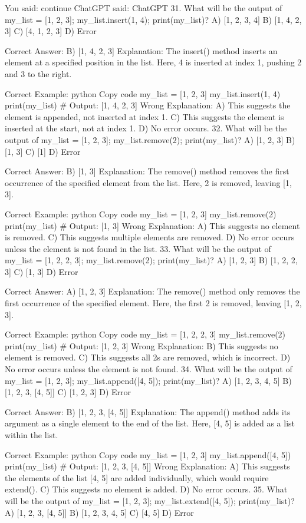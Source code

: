 You said:
continue
ChatGPT said:
ChatGPT
31. What will be the output of my_list = [1, 2, 3]; my_list.insert(1, 4); print(my_list)?
A) [1, 2, 3, 4]
B) [1, 4, 2, 3]
C) [4, 1, 2, 3]
D) Error

Correct Answer: B) [1, 4, 2, 3]
Explanation: The insert() method inserts an element at a specified position in the list. Here, 4 is inserted at index 1, pushing 2 and 3 to the right.

Correct Example:
python
Copy code
my_list = [1, 2, 3]
my_list.insert(1, 4)
print(my_list)  # Output: [1, 4, 2, 3]
Wrong Explanation:
A) This suggests the element is appended, not inserted at index 1.
C) This suggests the element is inserted at the start, not at index 1.
D) No error occurs.
32. What will be the output of my_list = [1, 2, 3]; my_list.remove(2); print(my_list)?
A) [1, 2, 3]
B) [1, 3]
C) [1]
D) Error

Correct Answer: B) [1, 3]
Explanation: The remove() method removes the first occurrence of the specified element from the list. Here, 2 is removed, leaving [1, 3].

Correct Example:
python
Copy code
my_list = [1, 2, 3]
my_list.remove(2)
print(my_list)  # Output: [1, 3]
Wrong Explanation:
A) This suggests no element is removed.
C) This suggests multiple elements are removed.
D) No error occurs unless the element is not found in the list.
33. What will be the output of my_list = [1, 2, 2, 3]; my_list.remove(2); print(my_list)?
A) [1, 2, 3]
B) [1, 2, 2, 3]
C) [1, 3]
D) Error

Correct Answer: A) [1, 2, 3]
Explanation: The remove() method only removes the first occurrence of the specified element. Here, the first 2 is removed, leaving [1, 2, 3].

Correct Example:
python
Copy code
my_list = [1, 2, 2, 3]
my_list.remove(2)
print(my_list)  # Output: [1, 2, 3]
Wrong Explanation:
B) This suggests no element is removed.
C) This suggests all 2s are removed, which is incorrect.
D) No error occurs unless the element is not found.
34. What will be the output of my_list = [1, 2, 3]; my_list.append([4, 5]); print(my_list)?
A) [1, 2, 3, 4, 5]
B) [1, 2, 3, [4, 5]]
C) [1, 2, 3]
D) Error

Correct Answer: B) [1, 2, 3, [4, 5]]
Explanation: The append() method adds its argument as a single element to the end of the list. Here, [4, 5] is added as a list within the list.

Correct Example:
python
Copy code
my_list = [1, 2, 3]
my_list.append([4, 5])
print(my_list)  # Output: [1, 2, 3, [4, 5]]
Wrong Explanation:
A) This suggests the elements of the list [4, 5] are added individually, which would require extend().
C) This suggests no element is added.
D) No error occurs.
35. What will be the output of my_list = [1, 2, 3]; my_list.extend([4, 5]); print(my_list)?
A) [1, 2, 3, [4, 5]]
B) [1, 2, 3, 4, 5]
C) [4, 5]
D) Error

